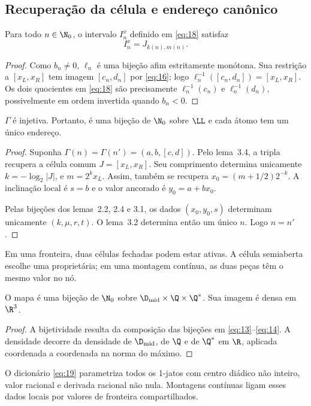 \subsection{Recuperação da célula e endereço canônico}
\begin{lema}
Para todo $n\in\N_0$, o intervalo $I_n^x$ definido em \eqref{eq:18} satisfaz
\[
I_n^x=J_{k(n),m(n)}.
\]
\end{lema}
\begin{proof}
Como $b_n\ne0$, $\ell_n$ é uma bijeção afim estritamente monótona. Sua restrição a $[x_L,x_R]$ tem imagem $[c_n,d_n]$ por \eqref{eq:16}; logo $\ell_n^{-1}([c_n,d_n])=[x_L,x_R]$. Os dois quocientes em \eqref{eq:18} são precisamente $\ell_n^{-1}(c_n)$ e $\ell_n^{-1}(d_n)$, possivelmente em ordem invertida quando $b_n<0$.
\end{proof}
\begin{teorema}
$\Gamma$ é injetiva. Portanto, é uma bijeção de $\N_0$ sobre $\LL$ e cada átomo tem um único endereço.
\end{teorema}
\begin{proof}
Suponha $\Gamma(n)=\Gamma(n')=(a,b,[c,d])$. Pelo lema~3.4, a tripla recupera a célula comum $J=[x_L,x_R]$. Seu comprimento determina unicamente $k=-\log_2|J|$, e $m=2^kx_L$. Assim, também se recupera $x_0=(m+1/2)2^{-k}$. A inclinação local é $s=b$ e o valor ancorado é $y_0=a+bx_0$.

Pelas bijeções dos lemas~2.2, 2.4 e 3.1, os dados $(x_0,y_0,s)$ determinam unicamente $(k,\mu,r,t)$. O lema~3.2 determina então um único $n$. Logo $n=n'$.
\end{proof}
Em uma fronteira, duas células fechadas podem estar ativas. A célula semiaberta escolhe uma proprietária; em uma montagem contínua, as duas peças têm o mesmo valor no nó.
\begin{teorema}
O mapa
é uma bijeção de $\N_0$ sobre $\D_{\rm mid}\times\Q\times\Q^*$. Sua imagem é densa em $\R^3$.
\end{teorema}
\begin{proof}
A bijetividade resulta da composição das bijeções em \eqref{eq:13}--\eqref{eq:14}. A densidade decorre da densidade de $\D_{\rm mid}$, de $\Q$ e de $\Q^*$ em $\R$, aplicada coordenada a coordenada na norma do máximo.
\end{proof}
O dicionário \eqref{eq:19} parametriza todos os 1-jatos com centro diádico não inteiro, valor racional e derivada racional não nula. Montagens contínuas ligam esses dados locais por valores de fronteira compartilhados.
